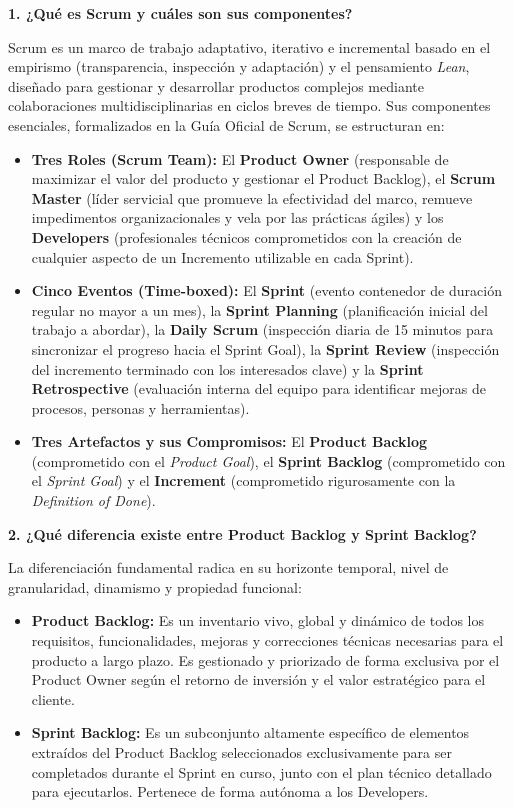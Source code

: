 \noindent\textbf{\color{mauve} 1. ¿Qué es Scrum y cuáles son sus componentes?}\par
\noindent Scrum es un marco de trabajo adaptativo, iterativo e incremental basado en el empirismo (transparencia, inspección y adaptación) y el pensamiento \textit{Lean}, diseñado para gestionar y desarrollar productos complejos mediante colaboraciones multidisciplinarias en ciclos breves de tiempo. Sus componentes esenciales, formalizados en la Guía Oficial de Scrum, se estructuran en:
\begin{itemize}
    \item \textbf{Tres Roles (Scrum Team):} El \textbf{Product Owner} (responsable de maximizar el valor del producto y gestionar el Product Backlog), el \textbf{Scrum Master} (líder servicial que promueve la efectividad del marco, remueve impedimentos organizacionales y vela por las prácticas ágiles) y los \textbf{Developers} (profesionales técnicos comprometidos con la creación de cualquier aspecto de un Incremento utilizable en cada Sprint).
    \item \textbf{Cinco Eventos (Time-boxed):} El \textbf{Sprint} (evento contenedor de duración regular no mayor a un mes), la \textbf{Sprint Planning} (planificación inicial del trabajo a abordar), la \textbf{Daily Scrum} (inspección diaria de 15 minutos para sincronizar el progreso hacia el Sprint Goal), la \textbf{Sprint Review} (inspección del incremento terminado con los interesados clave) y la \textbf{Sprint Retrospective} (evaluación interna del equipo para identificar mejoras de procesos, personas y herramientas).
    \item \textbf{Tres Artefactos y sus Compromisos:} El \textbf{Product Backlog} (comprometido con el \textit{Product Goal}), el \textbf{Sprint Backlog} (comprometido con el \textit{Sprint Goal}) y el \textbf{Increment} (comprometido rigurosamente con la \textit{Definition of Done}).
\end{itemize}

\vspace{0.6em}
\noindent\textbf{\color{mauve} 2. ¿Qué diferencia existe entre Product Backlog y Sprint Backlog?}\par
\noindent La diferenciación fundamental radica en su horizonte temporal, nivel de granularidad, dinamismo y propiedad funcional:
\begin{itemize}
    \item \textbf{Product Backlog:} Es un inventario vivo, global y dinámico de todos los requisitos, funcionalidades, mejoras y correcciones técnicas necesarias para el producto a largo plazo. Es gestionado y priorizado de forma exclusiva por el Product Owner según el retorno de inversión y el valor estratégico para el cliente.
    \item \textbf{Sprint Backlog:} Es un subconjunto altamente específico de elementos extraídos del Product Backlog seleccionados exclusivamente para ser completados durante el Sprint en curso, junto con el plan técnico detallado para ejecutarlos. Pertenece de forma autónoma a los Developers.
\end{itemize}

